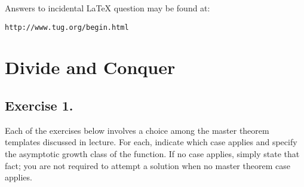 \documentclass{article}%
\begin{document}
\vspace*{0.5in}
\noindent Answers to incidental LaTeX question may be found at:
\begin{verbatim}
http://www.tug.org/begin.html
\end{verbatim}

\section*{Divide and Conquer}
\subsection*{Exercise 1.}

Each of the exercises below involves a choice among the master theorem templates discussed in lecture.
For each, indicate which case applies and specify the asymptotic growth class of the function.  If no
case applies, simply state that fact; you are not required to attempt a solution when no master theorem case
applies.
\end{document}
